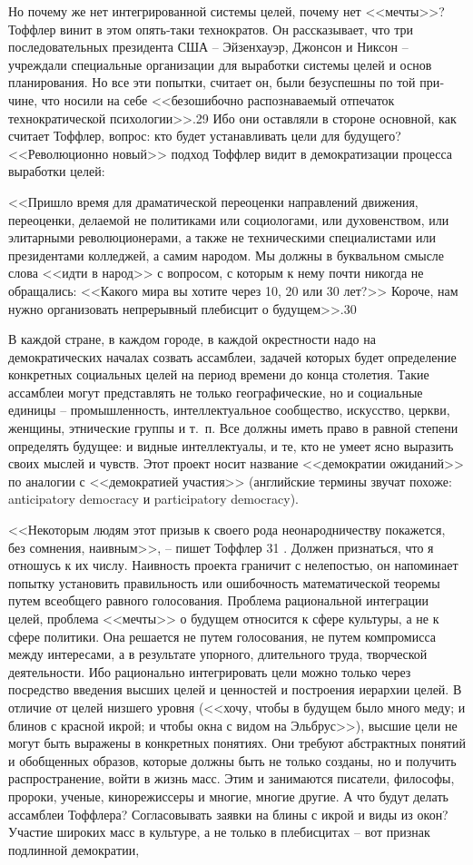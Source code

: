 \documentclass{book}
\begin{document}
{Но почему же нет интегрированной системы целей, почему нет <<мечты>>? Тоффлер винит в этом опять‑таки технократов. Он рассказывает, что три последовательных президента США -- Эйзенхауэр, Джонсон и Никсон -- учреждали специальные орга­низации для выработки системы целей и основ планирования. Но все эти попытки, считает он, были безуспешны по той при­чине, что носили на себе <<безошибочно распознаваемый отпе­чаток технократической психологии>>.29 Ибо они оставляли в стороне основной, как считает Тоффлер, вопрос: кто будет устанавливать цели для будущего? <<Революционно новый>> под­ход Тоффлер видит в демократизации процесса выработки це­лей:

<<Пришло время для драматической переоценки направлений движения, переоценки, делаемой не политиками или социоло­гами, или духовенством, или элитарными революционерами, а также не техническими специалистами или президентами кол­леджей, а самим народом. Мы должны в буквальном смысле слова <<идти в народ>> с вопросом, с которым к нему почти ни­когда не обращались: <<Какого мира вы хотите через 10, 20 или 30 лет?>> Короче, нам нужно организовать непрерывный плебис­цит о будущем>>.30

В каждой стране, в каждом городе, в каждой окрестности надо на демократических началах созвать ассамблеи, задачей которых будет определение конкретных социальных целей на период времени до конца столетия. Такие ассамблеи могут представлять не только географические, но и социальные единицы -- промышленность, интеллектуальное сообщество, искусство, церкви, женщины, этнические группы и т.~п. Все должны иметь право в равной степени определять будущее: и видные интеллектуалы, и те, кто не умеет ясно выразить своих мыслей и чувств. Этот проект носит название <<демократии ожиданий>> по аналогии с <<демократией участия>> (английские термины звучат похоже: anticipatory democracy и participatory democracy).

<<Некоторым людям этот призыв к своего рода неонародни­честву покажется, без сомнения, наивным>>, -- пишет Тоф­флер 31 . Должен признаться, что я отношусь к их числу. Наив­ность проекта граничит с нелепостью, он напоминает попытку установить правильность или ошибочность математической те­оремы путем всеобщего равного голосования. Проблема раци­ональной интеграции целей, проблема <<мечты>> о будущем от­носится к сфере культуры, а не к сфере политики. Она решает­ся не путем голосования, не путем компромисса между инте­ресами, а в результате упорного, длительного труда, творче­ской деятельности. Ибо рационально интегрировать цели можно только через посредство введения высших целей и ценностей и построения иерархии целей. В отличие от целей низшего уров­ня (<<хочу, чтобы в будущем было много меду; и блинов с крас­ной икрой; и чтобы окна с видом на Эльбрус>>), высшие цели не могут быть выражены в конкретных понятиях. Они требуют абстрактных понятий и обобщенных образов, которые должны быть не только созданы, но и получить распространение, войти в жизнь масс. Этим и занимаются писатели, философы, пророки, ученые, кинорежиссеры и многие, многие другие. А что будут делать ассамблеи Тоффлера? Согласовывать заявки на блины с икрой и виды из окон? Участие широких масс в культуре, а не только в плебисцитах -- вот признак подлинной демокра­тии,

}
\end{document}
